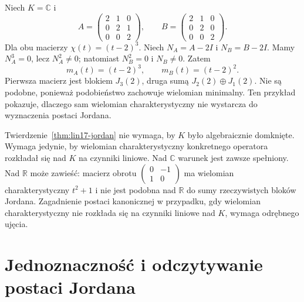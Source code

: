 \begin{przyklad}
\label{prz:lin17-same-char}
Niech \(K=\mathbb C\) i
\[
 A=\begin{pmatrix}2&1&0\\0&2&1\\0&0&2\end{pmatrix},
 \qquad
 B=\begin{pmatrix}2&1&0\\0&2&0\\0&0&2\end{pmatrix}.
\]
Dla obu macierzy
\(\chi(t)=(t-2)^3\).
Niech \(N_A=A-2I\) i \(N_B=B-2I\).
Mamy \(N_A^3=0\), lecz \(N_A^2\ne0\);
natomiast \(N_B^2=0\) i \(N_B\ne0\).
Zatem
\[
 m_A(t)=(t-2)^3,\qquad
 m_B(t)=(t-2)^2.
\]
Pierwsza macierz jest blokiem \(J_3(2)\),
druga sumą \(J_2(2)\oplus J_1(2)\).
Nie są podobne, ponieważ podobieństwo
zachowuje wielomian minimalny.
Ten przykład pokazuje, dlaczego sam
wielomian charakterystyczny nie wystarcza
do wyznaczenia postaci Jordana.
\end{przyklad}

\begin{uwaga}
\label{rem:lin17-field}
Twierdzenie~\ref{thm:lin17-jordan}
nie wymaga, by \(K\) było algebraicznie domknięte.
Wymaga jedynie, by wielomian charakterystyczny
konkretnego operatora rozkładał się nad \(K\)
na czynniki liniowe.
Nad \(\mathbb C\) warunek jest zawsze spełniony.
Nad \(\mathbb R\) może zawieść:
macierz obrotu
\(\begin{pmatrix}0&-1\\1&0\end{pmatrix}\)
ma wielomian charakterystyczny \(t^2+1\)
i nie jest podobna nad \(\mathbb R\)
do sumy rzeczywistych bloków Jordana.
Zagadnienie postaci kanonicznej w przypadku,
gdy wielomian charakterystyczny nie rozkłada się
na czynniki liniowe nad \(K\), wymaga odrębnego ujęcia.
\end{uwaga}

\section{Jednoznaczność i odczytywanie postaci Jordana}
\label{sec:lin17-uniqueness}

